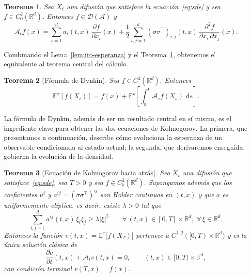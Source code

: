 \documentclass[12pt, a4paper]{report}
\theoremstyle{plain}
\newtheorem{theorem}{Teorema}[chapter]
\theoremstyle{definition}
\theoremstyle{remark}
\newcommand{\R}{\mathbb{R}}
\newcommand{\E}{\mathbb{E}}
\newcommand{\dd}{\,\mathrm{d}}
\begin{document}
\begin{theorem}
\label{thm:generador-difusion}
Sea $X_t$ una difusión que satisface la ecuación~\eqref{eq:sde} y sea $f \in C_0^2(\R^d)$. Entonces $f \in \mathcal{D}(\mathcal{A})$ y
\begin{equation}
  \label{eq:generador}
  \mathcal{A}_t f(x) = \sum_{i=1}^{d} u_i(t,x)\,\frac{\partial f}{\partial x_i}(x)
  + \frac{1}{2}\sum_{i,j=1}^{d} (\sigma\sigma^{\top})_{i,j}(t, x)\,
  \frac{\partial^2 f}{\partial x_i\,\partial x_j}(x).
\end{equation}
\end{theorem}

Combinando el Lema~\ref{lem:ito-esperanza} y el Teorema~\ref{thm:generador-difusion}, obtenemos el equivalente al teorema central del cálculo.

\begin{theorem}[Fórmula de Dynkin]
\label{thm:dynkin}
Sea $f \in C^2(\R^d)$. Entonces
\begin{equation}
  \label{eq:dynkin}
  \E^x[f(X_t)]
  = f(x) + \E^x\!\left[\int_0^t \mathcal{A}_s f(X_s)\,\dd s\right].
\end{equation}
\end{theorem}

La fórmula de Dynkin, además de ser un resultado central en sí mismo, es el ingrediente clave para obtener las dos ecuaciones de Kolmogorov. La primera, que presentamos a continuación, describe cómo evoluciona la esperanza de un observable condicionada al estado actual; la segunda, que derivaremos enseguida, gobierna la evolución de la densidad.

\begin{theorem}[Ecuación de Kolmogorov hacia atrás]
\label{thm:kolmogorov-backward}
Sea $X_t$ una difusión que satisface~\eqref{eq:sde}, sea $T > 0$ y sea $f \in C^2_b(\R^d)$. Supongamos además que los coeficientes $u^i$ y $a^{ij} = (\sigma\sigma^\top)^{ij}$ son Hölder continuos en $(t,x)$ y que $a$ es uniformemente elíptica, es decir, existe $\lambda > 0$ tal que
\[
  \sum_{i,j=1}^d a^{ij}(t,x)\,\xi_i\xi_j \geq \lambda|\xi|^2
  \qquad \forall\,(t,x) \in [0,T]\times\R^d,\;\forall\,\xi \in \R^d.
\]
Entonces la función $v(t,x) = \E^x\bigl[f(X_T)\bigr]$ pertenece a $C^{1,2}([0,T)\times\R^d)$ y es la única solución clásica de
\[
  \frac{\partial v}{\partial t}(t,x) + \mathcal{A}_t v(t,x) = 0,
  \qquad (t,x) \in [0,T) \times \R^d,
\]
con condición terminal $v(T,x) = f(x)$.
\end{theorem}
\end{document}
